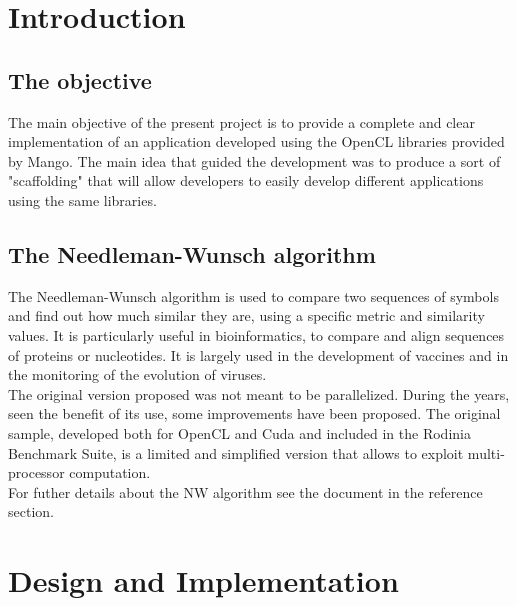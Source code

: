 \section{Introduction}

\subsection{The objective}
The main objective of the present project is to provide a complete and clear implementation of an application developed using the OpenCL libraries provided by Mango. The main idea that guided the development was to produce a sort of "scaffolding" that will allow developers to easily develop different applications using the same libraries.

\subsection{The Needleman-Wunsch algorithm}
The Needleman-Wunsch algorithm is used to compare two sequences of symbols and find out how much similar they are, using a specific metric and similarity values. It is particularly useful in bioinformatics, to compare and align sequences of proteins or nucleotides. It is largely used in the development of vaccines and in the monitoring of the evolution of viruses.\\The original version proposed was not meant to be parallelized. During the years, seen the benefit of its use, some improvements have been proposed. The original sample, developed both for OpenCL and Cuda and included in the Rodinia Benchmark Suite, is a limited and simplified version that allows to exploit multi-processor computation.\\For futher details about the NW algorithm see the document\cite{nw} in the reference section.

\section{Design and Implementation}

